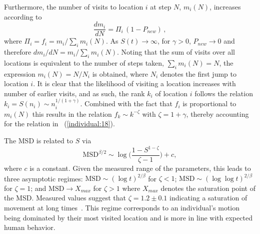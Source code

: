 Furthermore, the number of visits to location $i$ at step $N$, $m_i(N)$, increases according to 
\begin{equation}
\frac{d m_i}{d N} = \Pi_i \, (1-P_{new}) \, ,
\end{equation}
where $\Pi_i = f_i = m_i / \sum_i m_i(N)$. As $S(t) \to \infty$, for $\gamma > 0$, $P_{new} \to 0$ and therefore $d m_i/d N = m_i/\sum_i m_i(N)$. Noting that the sum of visits over all locations is equivalent to the number of steps taken, $\sum_i m_i(N) = N$, the expression $m_i(N) = N/N_i$ is obtained, where $N_i$ denotes the first jump to location $i$. It is clear that the likelihood of visiting a location increases with number of earlier visits, and as such, the rank $k_i$ of location $i$ follows the relation $k_i = S(n_i) \sim n_i^{1/(1+ \gamma)}$. Combined with the fact that $f_i$ is proportional to $m_i(N)$ this results in the relation $f_k \sim k^{-\zeta}$ with $\zeta = 1 + \gamma$, thereby accounting for the relation in \equationname~(\ref{individual:18}).

 The MSD is related to $S$ via
\begin{equation}
\mathrm{MSD} ^{\beta/2} \sim \log \Big(\frac{1-S^{1-\zeta}}{\zeta -1}\Big) + c ,
\end{equation}
where $c$ is a constant. Given the measured range of the parameters, this leads to three asymptotic regimes: $\mathrm{MSD} \sim (\log t)^{2/\beta}$ for $\zeta<1$; $\mathrm{MSD} \sim (\log\log t)^{2/\beta}$ for $\zeta=1$;  and $\mathrm{MSD}  \to X_{max}$ for $\zeta > 1$ where $X_{max}$ denotes the saturation point of the MSD.  Measured values suggest that $\zeta = 1.2 \pm 0.1$ indicating a saturation of movement at long times~\cite{song_2010_modelling}. This regime corresponds to an individual's motion being dominated by their most visited location and is more in line with expected human behavior.


